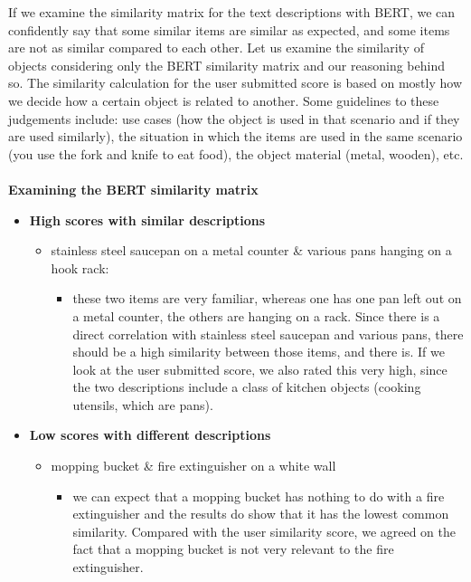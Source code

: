 \documentclass[]{article}
\begin{document}
If we examine the similarity matrix for the text descriptions with BERT, we can confidently say that some similar items are similar as expected, and some items are not as similar compared to each other. Let us examine the similarity of objects considering only the BERT similarity matrix and our reasoning behind so. The similarity calculation for the user submitted score is based on mostly how we decide how a certain object is related to another. Some guidelines to these judgements include: use cases (how the object is used in that scenario and if they are used similarly), the situation in which the items are used in the same scenario (you use the fork and knife to eat food), the object material (metal, wooden), etc.\\
\\
\textbf{Examining the BERT similarity matrix}
\begin{itemize}
    \item \textbf{High scores with similar descriptions}
    \begin{itemize}
        \item stainless steel saucepan on a metal counter \& various pans hanging on a hook rack:
        \begin{itemize}
            \item these two items are very familiar, whereas one has one pan left out on a metal counter, the others are hanging on a rack. Since there is a direct correlation with stainless steel saucepan and various pans, there should be a high similarity between those items, and there is. If we look at the user submitted score, we also rated this very high, since the two descriptions include a class of kitchen objects (cooking utensils, which are pans).
        \end{itemize}
    \end{itemize}
    \item \textbf{Low scores with different descriptions}
    \begin{itemize}
        \item mopping bucket \& fire extinguisher on a white wall
        \begin{itemize}
            \item we can expect that a mopping bucket has nothing to do with a fire extinguisher and the results do show that it has the lowest common similarity. Compared with the user similarity score, we agreed on the fact that a mopping bucket is not very relevant to the fire extinguisher.
        \end{itemize}

\end{itemize}
\end{itemize}
\end{document}
